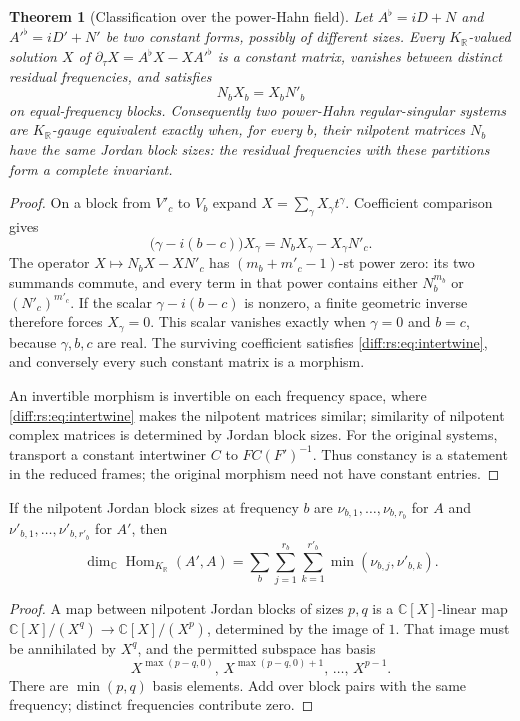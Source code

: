 \documentclass[11pt,letterpaper]{article}
\numberwithin{equation}{section}
\newtheorem{theorem}{Theorem}[section]
\theoremstyle{definition}
\theoremstyle{remark}
\newcommand{\R}{\mathbb R}
\newcommand{\C}{\mathbb C}
\newcommand{\der}{\partial}
\newcommand{\Hom}{\operatorname{Hom}}
\newcommand{\derT}{\der_{\tau}}
\newcommand{\KR}{K_{\R}}
\begin{document}
\begin{theorem}[Classification over the power-Hahn field]
\label{diff:rs:thm:Kclass}
Let $A^{\flat}=iD+N$ and $A'^{\flat}=iD'+N'$ be two constant forms, possibly of
different sizes. Every $\KR$-valued solution $X$ of
$\derT X=A^{\flat}X-XA'^{\flat}$ is a constant matrix, vanishes between distinct
residual frequencies, and satisfies
\begin{equation}\label{diff:rs:eq:intertwine}
 N_{b}X_{b}=X_{b}N'_{b}
\end{equation}
on equal-frequency blocks. Consequently two power-Hahn regular-singular systems
are $\KR$-gauge equivalent exactly when, for every $b$, their nilpotent matrices
$N_{b}$ have the same Jordan block sizes: the residual frequencies with these
partitions form a complete invariant.
\end{theorem}
\begin{proof}
On a block from $V'_{c}$ to $V_{b}$ expand $X=\sum_{\gamma}X_{\gamma}t^{\gamma}$.
Coefficient comparison gives
\begin{equation}\label{diff:rs:eq:morphismcoeff}
 \bigl(\gamma-i(b-c)\bigr)X_{\gamma}=N_{b}X_{\gamma}-X_{\gamma}N'_{c}.
\end{equation}
The operator $X\mapsto N_bX-XN'_c$ has
$(m_b+m'_c-1)$-st power zero: its two summands commute, and every
term in that power contains either $N_b^{m_b}$ or $(N'_c)^{m'_c}$.
If the scalar $\gamma-i(b-c)$ is nonzero, a finite geometric inverse
therefore forces $X_{\gamma}=0$. This scalar vanishes exactly when
$\gamma=0$ and $b=c$, because $\gamma,b,c$ are real. The surviving
coefficient satisfies \cref{diff:rs:eq:intertwine}, and conversely
every such constant matrix is a morphism.

An invertible morphism is invertible on each frequency space, where
\cref{diff:rs:eq:intertwine} makes the nilpotent matrices similar;
similarity of nilpotent complex matrices is determined by Jordan block
sizes. For the original systems, transport a constant intertwiner $C$
to $FC(F')^{-1}$. Thus constancy is a statement in the reduced frames;
the original morphism need not have constant entries.
\end{proof}

\begin{corollary}[Exact morphism dimensions over $\KR$]
\label{diff:rs:cor:HomK}
If the nilpotent Jordan block sizes at frequency $b$ are
$\nu_{b,1},\dots,\nu_{b,r_{b}}$ for $A$ and $\nu'_{b,1},\dots,\nu'_{b,r'_{b}}$
for $A'$, then
\[
 \dim_{\C}\Hom_{\KR}(A',A)=\sum_{b}\sum_{j=1}^{r_{b}}\sum_{k=1}^{r'_{b}}
 \min(\nu_{b,j},\nu'_{b,k}).
\]
\end{corollary}
\begin{proof}
A map between nilpotent Jordan blocks of sizes $p,q$ is a $\C[X]$-linear map
$\C[X]/(X^{q})\to\C[X]/(X^{p})$, determined by the image of $1$.
That image must be annihilated by $X^{q}$, and the permitted subspace
has basis
\[
 X^{\max(p-q,0)},\,X^{\max(p-q,0)+1},\,\ldots,\,X^{p-1}.
\]
There are $\min(p,q)$ basis elements. Add over block pairs with the
same frequency; distinct frequencies contribute zero.
\end{proof}
\end{document}
